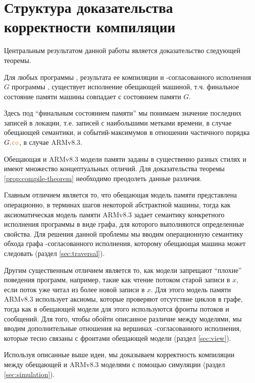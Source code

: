 \section{Структура доказательства корректности компиляции}
\label{sec:highlevel}
Центральным результатом данной работы является доказательство следующей теоремы.
\begin{theorem}
  \label{prop:compile-theorem}
  Для любых программы \Prog, результата ее компиляции \ProgARM и \ARM-согласованного исполнения $G$ программы
  \ProgARM, существует исполнение \Prog обещающей машиной, т.ч. 
  финальное состояние памяти машины совпадает с состоянием памяти $G$.
\end{theorem}
\noindent
Здесь под ``финальным состоянием памяти'' мы понимаем значение последних записей в локации, т.е. записей с наибольшими
метками времени, в случае обещающей семантики, и событий-максимумов в отношении частичного порядка $G.\lCO$, в случае ARMv8.3.

Обещающая и ARMv8.3 модели памяти заданы в существенно разных стилях и имеют множество концептуальных отличий.
Для доказательства теоремы \ref{prop:compile-theorem} необходимо преодолеть данные различия.

Главным отличием является то, что обещающая модель памяти представлена операционно, в терминах
шагов некоторой абстрактной машины, тогда как аксиоматическая модель памяти ARMv8.3 задает семантику конкретного
исполнения программы в виде графа, для которого выполняются определенные свойства. 
Для решения данной проблемы мы вводим операционную семантику обхода графа \ARM-согласованного исполнения,
которому обещающая машина может следовать (раздел \ref{sec:traversal}).

Другим существенным отличием является то, как модели запрещают ``плохие'' поведения программ, например,
такие как чтение потоком старой записи в $x$, если поток уже читал из более новой записи в $x$.
Для этого модель памяти ARMv8.3 использует аксиомы, которые проверяют отсутствие циклов в графе, тогда
как в обещающей модели для этого используются фронты потоков и сообщений.
Для того, чтобы обойти описанное различие между моделями,
мы вводим дополнительные отношения на вершинах \ARM-согласованного исполнения,
которые тесно связаны с фронтами обещающей модели (раздел \ref{sec:view}).

Используя описанные выше идеи, мы доказываем корректность компиляции между обещающей и ARMv8.3 моделями
с помощью симуляции (раздел \ref{sec:simulation}).

